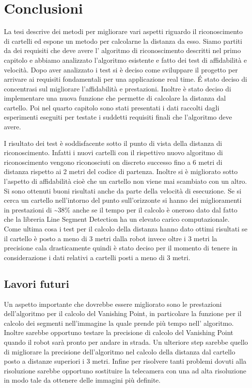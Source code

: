 
\chapter{Conclusioni}

	La tesi descrive dei metodi per migliorare vari aspetti riguardo il riconoscimento di cartelli ed espone un metodo per calcolarne la distanza da esso. Siamo partiti da dei requisiti che deve avere l' algoritmo di riconoscimento descritti nel primo capitolo e abbiamo analizzato l'algoritmo esistente e fatto dei test di affidabilità e velocità. Dopo aver analizzato i test si è deciso come sviluppare il progetto per arrivare ai requisiti fondamentali per una applicazione real time. \'E stato deciso di concentrasi sul migliorare l'affidabilità e prestazioni. Inoltre è stato deciso di implementare una nuova funzione che permette di calcolare la distanza dal cartello. Poi nel quarto capitolo sono stati presentati i dati raccolti dagli esperimenti eseguiti per testate i suddetti requisiti finali che l'algoritmo deve avere.

	I risultato dei test è soddisfacente sotto il punto di vista della distanza di riconoscimento. Infatti i nuovi cartelli con il rispettivo nuovo algoritmo di riconoscimento vengono riconosciuti on discreto successo fino a 6 metri di distanza rispetto ai 2 metri del codice di partenza. Inoltre si è migliorato sotto l'aspetto di affidabilità cioè che un cartello non viene mai scambiato con un altro. Si sono ottenuti buoni risultati anche da parte della velocità di esecuzione. Se si cerca un cartello nell'intorno del punto sull'orizzonte si hanno dei miglioramenti in prestazioni di \textasciitilde $38$\% anche se il tempo per il calcolo è oneroso dato dal fatto che la libreria Line Segment Detection ha un elevato carico computazionale. Come ultima cosa i test per il calcolo della distanza hanno dato ottimi risultati se il cartello è posto a meno di 3 metri dalla robot invece oltre i 3 metri la precisione cala drasticamente quindi è stato deciso per il momento di tenere in considerazione i dati relativi a cartelli posti a meno di 3 metri.

\section{Lavori futuri}

	Un aspetto importante che dovrebbe essere migliorato sono le prestazioni dell'algoritmo per il calcolo del Vanishing Point, in particolare la funzione per il calcolo dei segmenti nell'immagine la quale prende più tempo nell' algoritmo. Inoltre sarebbe opportuno testare la precisione di calcolo del Vanishing Point quando il robot sarà pronto per andare in strada. Un ulteriore step sarebbe quello di migliorare la precisione dell'algoritmo nel calcolo della distanza dal cartello posto a distanze superiori i 3 metri. Infine per risolvere tanti problemi dovuti alla risoluzione sarebbe opportuno sostituire la telecamera con una ad alta risoluzione in modo tale da ottenere delle immagini più definite.